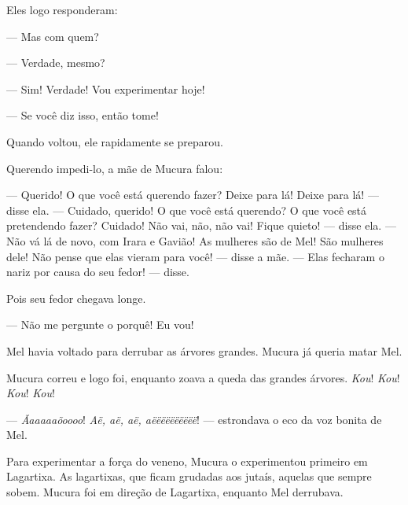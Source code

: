
Eles logo responderam:


--- Mas com quem? 



--- Verdade, mesmo? 

--- Sim! Verdade! Vou experimentar hoje!

--- Se você diz isso, então tome! 

Quando voltou, ele rapidamente se preparou. 

Querendo impedi-lo, a mãe de Mucura falou: 

--- Querido! O que você está querendo fazer? Deixe para lá! Deixe para
lá! --- disse ela. --- Cuidado, querido! O que você está querendo? O que
você está pretendendo fazer? Cuidado! Não vai, não, não vai! Fique
quieto! --- disse ela. --- Não vá lá de novo, com Irara e Gavião! As
mulheres são de Mel! São mulheres dele! Não pense que elas vieram para você!
--- disse a mãe. --- Elas fecharam o nariz por causa do seu fedor!
--- disse.

Pois seu fedor chegava longe.

--- Não me pergunte o porquê! Eu vou! 

Mel havia voltado para derrubar as árvores grandes. Mucura já queria matar
Mel. 

Mucura correu e logo foi, enquanto zoava a queda das grandes
árvores. \textit{Kou}! \textit{Kou}! \textit{Kou}! \textit{Kou}! 

--- \textit{Ãaaaaaõoooo}! \textit{Aë, aë, aë, aëëëëëëëëëë}! --- estrondava o eco da voz bonita de Mel. 

Para experimentar a força do veneno, Mucura o experimentou primeiro em
Lagartixa. As lagartixas, que ficam grudadas aos jutaís, aquelas que
sempre sobem. Mucura foi em direção de Lagartixa, enquanto Mel
derrubava. 

